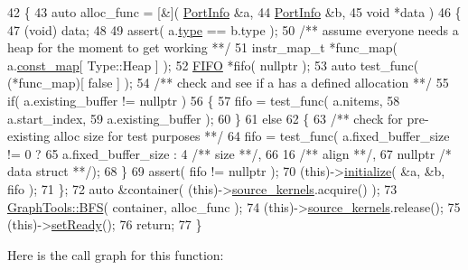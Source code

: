 \begin{DoxyCode}
42 \{
43    \textcolor{keyword}{auto} alloc\_func = [&]( \hyperlink{struct_port_info}{PortInfo} &a,
44                           \hyperlink{struct_port_info}{PortInfo} &b,
45                           \textcolor{keywordtype}{void} *data )
46    \{
47       (void) data;
48 
49       assert( a.\hyperlink{struct_port_info_a669818f0fde1da7b4a294c46e08d5980}{type} == b.type );\textcolor{comment}{}
50 \textcolor{comment}{      /** assume everyone needs a heap for the moment to get working **/}
51       instr\_map\_t *func\_map( a.\hyperlink{struct_port_info_a714592b5ab1fa47b599903639b102a66}{const\_map}[ Type::Heap ] );
52       \hyperlink{class_f_i_f_o}{FIFO} *fifo( \textcolor{keyword}{nullptr} );
53       \textcolor{keyword}{auto} test\_func( (*func\_map)[ \textcolor{keyword}{false} ] );\textcolor{comment}{}
54 \textcolor{comment}{      /** check and see if a has a defined allocation **/}
55       \textcolor{keywordflow}{if}( a.existing\_buffer != \textcolor{keyword}{nullptr} )
56       \{
57          fifo = test\_func( a.nitems,
58                            a.start\_index,
59                            a.existing\_buffer );
60       \}
61       \textcolor{keywordflow}{else}
62       \{\textcolor{comment}{}
63 \textcolor{comment}{         /** check for pre-existing alloc size for test purposes **/}
64          fifo = test\_func( a.fixed\_buffer\_size != 0 ?
65                               a.fixed\_buffer\_size : 4 \textcolor{comment}{/** size **/},
66                            16 \textcolor{comment}{/** align **/},
67                            \textcolor{keyword}{nullptr} \textcolor{comment}{/* data struct **/});
68       \}
69       assert( fifo != \textcolor{keyword}{nullptr} );
70       (\textcolor{keyword}{this})->\hyperlink{class_allocate_a1d5c71b5cd6fc9671ed82d9c1d04965c}{initialize}( &a, &b, fifo );
71    \};
72    \textcolor{keyword}{auto} &container( (\textcolor{keyword}{this})->\hyperlink{class_allocate_a93e612d7ea7eb686fc88b5dee7a1407b}{source\_kernels}.acquire() );
73    \hyperlink{class_graph_tools_ade51007699cbd681c1a37946609c46ee}{GraphTools::BFS}( container, alloc\_func );
74    (\textcolor{keyword}{this})->\hyperlink{class_allocate_a93e612d7ea7eb686fc88b5dee7a1407b}{source\_kernels}.release();
75    (\textcolor{keyword}{this})->\hyperlink{class_allocate_a4cf36bb704e43f5736a0e736d9e1a81b}{setReady}();
76    \textcolor{keywordflow}{return};
77 \}
\end{DoxyCode}
Here is the call graph for this function\+:
\nopagebreak
